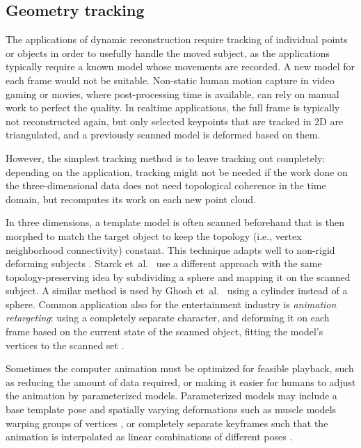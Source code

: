
\subsection{Geometry tracking} %

The applications of dynamic reconstruction require tracking of individual points or objects in order to usefully handle the moved subject, as the applications typically require a known model whose movements are recorded.
A new model for each frame would not be suitable.
Non-static human motion capture in video gaming or movies, where post-processing time is available, can rely on manual work to perfect the quality.
In realtime applications, the full frame is typically not reconstructed again, but only selected keypoints that are tracked in 2D are triangulated, and a previously scanned model is deformed based on them.

However, the simplest tracking method is to leave tracking out completely: depending on the application, tracking might not be needed if the work done on the three-dimensional data does not need topological coherence in the time domain, but recomputes its work on each new point cloud.

In three dimensions, a template model is often scanned beforehand that is then morphed to match the target object to keep the topology (i.e., vertex neighborhood connectivity) constant.
This technique adapts well to non-rigid deforming subjects \cite{bojsen2012tracking,li2009robust}.
Starck et~al.\ \cite{starck2007surface} use a different approach with the same topology-preserving idea by subdividing a sphere and mapping it on the scanned subject.
A similar method is used by Ghosh et~al.\ \cite{ghosh2011multiview} using a cylinder instead of a sphere.
Common application also for the entertainment industry is \emph{animation retargeting}: using a completely separate character, and deforming it on each frame based on the current state of the scanned object, fitting the model's vertices to the scanned set \cite{sumner2004deformation}.

Sometimes the computer animation must be optimized for feasible playback, such as reducing the amount of data required, or making it easier for humans to adjust the animation by parameterized models.
Parameterized models may include a base template pose and spatially varying deformations such as muscle models warping groups of vertices \cite{waters1987muscle}, or completely separate keyframes such that the animation is interpolated as linear combinations of different poses \cite{deng2007computer,beeler2011high}.

